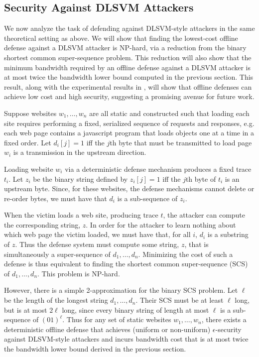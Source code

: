 \documentclass[10pt,journal]{IEEEtran}
\begin{document}
\subsection{Security Against DLSVM Attackers}

We now analyze the task of defending against DLSVM-style
attackers in the same theoretical setting as above.  We will show that
finding the lowest-cost offline defense against a DLSVM attacker
is NP-hard, via a reduction from the binary shortest common
super-sequence problem.  This reduction will also show that the
minimum bandwidth required by an offline defense against a DLSVM
attacker is at most twice the bandwidth lower bound computed in the
previous section.  This result, along with the experimental results in
, will show that offline defenses can achieve low
cost and high security, suggesting a promising avenue for future
work.

Suppose websites $w_1,\dots,w_n$ are all static and constructed such
that loading each site requires performing a fixed, serialized
sequence of requests and responses, e.g. each web page contains a
javascript program that loads objects one at a time in a fixed order.
Let $d_i[j]=1$ iff the $j$th byte that must be transmitted to load
page $w_i$ is a transmission in the upstream direction.  

Loading website $w_i$ via a deterministic defense mechanism produces a
fixed trace $t_i$. Let $z_i$ be the binary string defined by
$z_i[j]=1$ iff the $j$th byte of $t_i$ is an upstream byte.  Since,
for these websites, the defense mechanisms cannot delete or re-order
bytes, we must have that $d_i$ is a sub-sequence of $z_i$.

When the victim loads a web site, producing trace $t$, the attacker
can compute the corresponding string, $z$.  In order for the attacker
to learn nothing about which web page the victim loaded, we must have
that, for all $i$, $d_i$ is a substring of $z$.
Thus
the defense system must compute some string, $z$, that is
simultaneously a super-sequence of $d_1,\dots,d_n$.  Minimizing the
cost of such a defense is thus equivalent to finding the
shortest common super-sequence (SCS) of $d_1, \dots, d_n$.
This problem is NP-hard\cite{SCS_SR8}.

However, there is a simple 2-approximation for the binary SCS problem.
Let $\ell$ be the length of the longest string $d_1,\dots,d_n$.  Their
SCS must be at least $\ell$ long, but is at most $2\ell$ long, since
every binary string of length at most $\ell$ is a sub-sequence of
$(01)^\ell$.  Thus for any set of static websites $w_1,\dots,w_n$,
there exists a deterministic offline defense that achieves (uniform or
non-uniform) $\epsilon$-security against DLSVM-style attackers and
incurs bandwidth cost that is at most twice the bandwidth lower bound
derived in the previous section.
\end{document}
